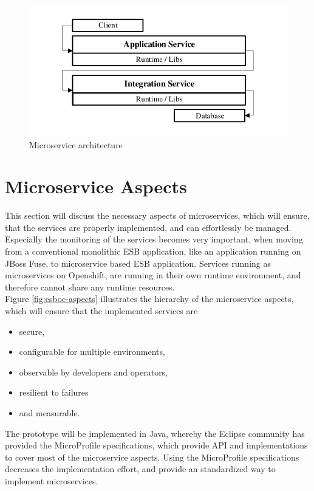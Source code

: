 \begin{figure}[htbp]
	\centering
	\includegraphics[scale=1]{images/esboc-design-microservice.pdf}
	\caption{Microservice architecture}
	\label{fig:esboc-design-services}
\end{figure}

\section{Microservice Aspects}
\label{sec:esboc-aspects}
This section will discuss the necessary aspects of microservices, which will ensure, that the services are properly implemented, and can effortlessly be managed. Especially the monitoring of the services becomes very important, when moving from a conventional monolithic ESB application, like an application running on JBoss Fuse, to microservice based ESB application. Services running as microservices on Openshift, are running in their own runtime environment, and therefore cannot share any runtime resources. \\

Figure \vref{fig:esboc-aspects} illustrates the hierarchy of the microservice aspects, which will ensure that the implemented services are
\begin{itemize}
	\item secure,
	\item configurable for multiple environments,
	\item observable by developers and operators,
	\item resilient to failures
	\item and measurable.
\end{itemize}

The prototype will be implemented in Java, whereby the Eclipse community has provided the MicroProfile specifications, which provide API and implementations to cover most of the microservice aspects. Using the MicroProfile specifications decreases the implementation effort, and provide an standardized way to implement microservices\cite{EclipseMicroprofileCharter2017}.
\newpage

